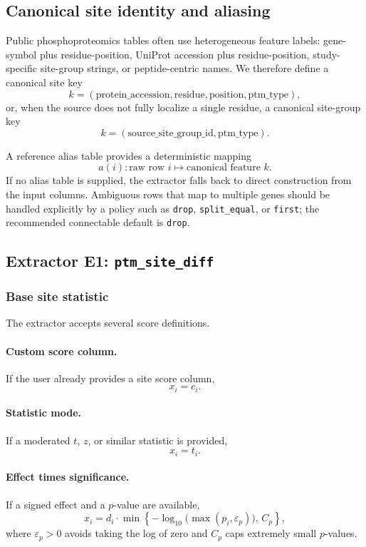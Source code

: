 \documentclass[11pt]{article}
\begin{document}
\subsection{Canonical site identity and aliasing}
Public phosphoproteomics tables often use heterogeneous feature labels:
gene-symbol plus residue-position, UniProt accession plus residue-position,
study-specific site-group strings, or peptide-centric names. We therefore define
a canonical site key
\[
k = (\mathrm{protein\_accession}, \mathrm{residue}, \mathrm{position},
\mathrm{ptm\_type}),
\]
or, when the source does not fully localize a single residue, a canonical
site-group key
\[
k = (\mathrm{source\_site\_group\_id}, \mathrm{ptm\_type}).
\]

A reference alias table provides a deterministic mapping
\[
a(i) : \text{raw row } i \mapsto \text{canonical feature } k.
\]
If no alias table is supplied, the extractor falls back to direct construction
from the input columns. Ambiguous rows that map to multiple genes should be
handled explicitly by a policy such as \texttt{drop}, \texttt{split\_equal}, or
\texttt{first}; the recommended connectable default is \texttt{drop}.

\subsection{Extractor E1: \texttt{ptm\_site\_diff}}
\label{sec:ptm_site_diff}

\subsubsection{Base site statistic}
The extractor accepts several score definitions.

\paragraph{Custom score column.}
If the user already provides a site score column,
\[
x_i = c_i.
\]

\paragraph{Statistic mode.}
If a moderated $t$, $z$, or similar statistic is provided,
\[
x_i = t_i.
\]

\paragraph{Effect times significance.}
If a signed effect and a $p$-value are available,
\begin{equation}
x_i = d_i \cdot \min \left\{ -\log_{10}\!\bigl(\max(p_i,\varepsilon_p)\bigr),\,
C_p \right\},
\label{eq:ptm_effect_times_sig}
\end{equation}
where $\varepsilon_p > 0$ avoids taking the log of zero and $C_p$ caps
extremely small $p$-values.
\end{document}
